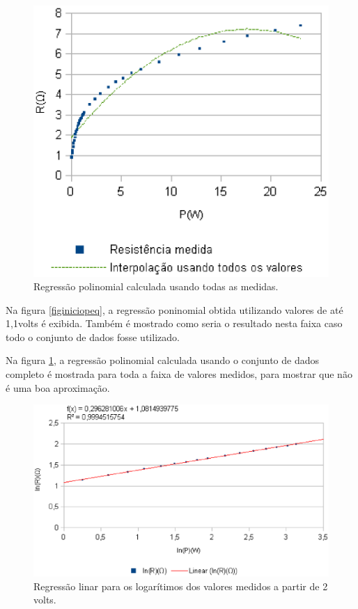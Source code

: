 \documentclass[brazilian,12pt,a4paper,twocolumn,final]{article}
\begin{document}
\begin{figure}[h]
  \caption{Regressão polinomial calculada usando todas as medidas.}
  \label{figiniciogr}
  \centering
    \includegraphics{iniciogr.eps}
\end{figure}

Na figura \ref{figiniciopeq}, a regressão poninomial obtida utilizando 
valores de até 1,1volts é exibida.
Também é 
mostrado como seria o resultado nesta faixa caso todo o conjunto de dados fosse utilizado.

Na figura \ref{figiniciogr}, a regressão polinomial calculada usando o
 conjunto de dados completo é mostrada para toda a faixa de valores medidos, para
mostrar que não é uma boa aproximação.

\begin{figure}[h]
  \caption{Regressão linar para os logarítimos dos valores medidos a partir de 2 volts.}
  \label{figfimpeq}
  \centering
    \includegraphics{fimpeq.eps}
\end{figure}
\end{document}

